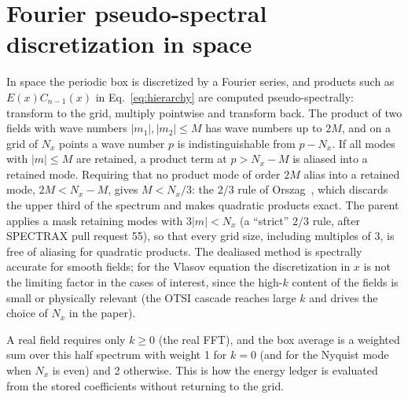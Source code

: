 \section{Fourier pseudo-spectral discretization in space}\label{sec:fourier}

In space the periodic box is discretized by a Fourier series, and products such as $E(x)C_{n-1}(x)$ in Eq.~\eqref{eq:hierarchy} are computed pseudo-spectrally: transform to the grid, multiply pointwise and transform back. The product of two fields with wave numbers $|m_1|,|m_2|\le M$ has wave numbers up to $2M$, and on a grid of $N_x$ points a wave number $p$ is indistinguishable from $p-N_x$. If all modes with $|m|\le M$ are retained, a product term at $p>N_x-M$ is aliased into a retained mode. Requiring that no product mode of order $2M$ alias into a retained mode, $2M<N_x-M$, gives $M<N_x/3$: the $2/3$ rule of Orszag~\citep{Orszag1971}, which discards the upper third of the spectrum and makes quadratic products exact. The parent applies a mask retaining modes with $3|m|<N_x$ (a ``strict'' $2/3$ rule, after SPECTRAX pull request 55), so that every grid size, including multiples of 3, is free of aliasing for quadratic products. The dealiased method is spectrally accurate for smooth fields; for the Vlasov equation the discretization in $x$ is not the limiting factor in the cases of interest, since the high-$k$ content of the fields is small or physically relevant (the OTSI cascade reaches large $k$ and drives the choice of $N_x$ in the paper).

A real field requires only $k\ge0$ (the real FFT), and the box average is a weighted sum over this half spectrum with weight 1 for $k=0$ (and for the Nyquist mode when $N_x$ is even) and 2 otherwise. This is how the energy ledger is evaluated from the stored coefficients without returning to the grid.

